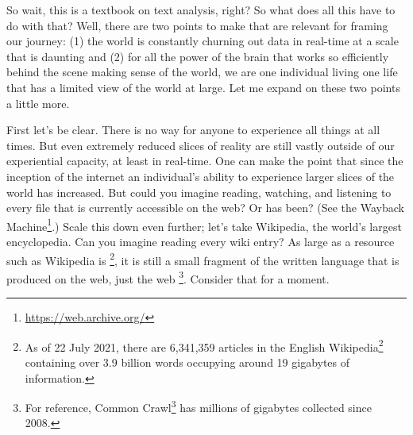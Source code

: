 \documentclass[
  letterpaper,
]{latex/krantz}
\DeclareRobustCommand{\href}[2]{#2\footnote{\url{#1}}}
\begin{document}
So wait, this is a textbook on text analysis, right? So what does all
this have to do with that? Well, there are two points to make that are
relevant for framing our journey: (1) the world is constantly churning
out data in real-time at a scale that is daunting and (2) for all the
power of the brain that works so efficiently behind the scene making
sense of the world, we are one individual living one life that has a
limited view of the world at large. Let me expand on these two points a
little more.

First let's be clear. There is no way for anyone to experience all
things at all times. But even extremely reduced slices of reality are
still vastly outside of our experiential capacity, at least in
real-time. One can make the point that since the inception of the
internet an individual's ability to experience larger slices of the
world has increased. But could you imagine reading, watching, and
listening to every file that is currently accessible on the web? Or has
been? (See the \href{https://web.archive.org/}{Wayback Machine}.) Scale
this down even further; let's take Wikipedia, the world's largest
encyclopedia. Can you imagine reading every wiki entry? As large as a
resource such as Wikipedia is \footnote{As of 22 July 2021, there are
  6,341,359 articles in the
  \href{https://en.wikipedia.org/wiki/English_Wikipedia}{English
  Wikipedia} containing over 3.9 billion words occupying around 19
  gigabytes of information.}, it is still a small fragment of the
written language that is produced on the web, just the web \footnote{For
  reference, \href{https://commoncrawl.org/big-picture/}{Common Crawl}
  has millions of gigabytes collected since 2008.}. Consider that for a
moment.
\end{document}
